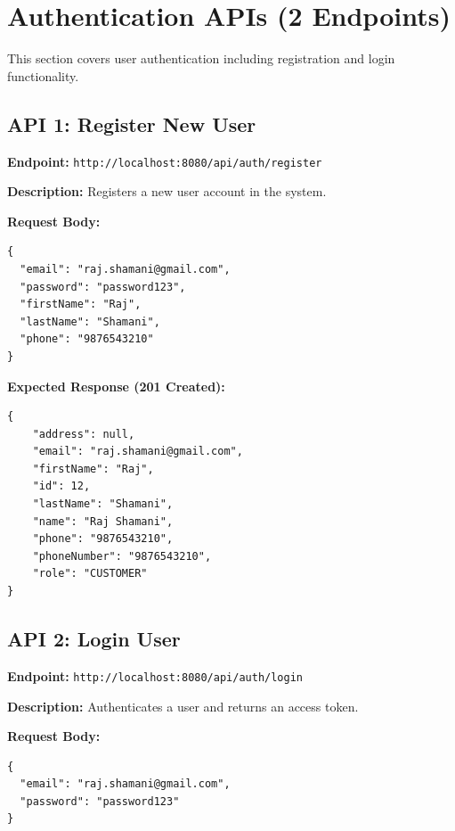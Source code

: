 \documentclass[12pt, a4paper]{article}
\begin{document}
\section{Authentication APIs (2 Endpoints)}

This section covers user authentication including registration and login functionality.

\subsection{API 1: Register New User}

\begin{tcolorbox}[colback=postcolor!10, colframe=postcolor, title=POST]
\textbf{Endpoint:} \texttt{http://localhost:8080/api/auth/register}
\end{tcolorbox}

\textbf{Description:} Registers a new user account in the system.

\textbf{Request Body:}
\begin{lstlisting}
{
  "email": "raj.shamani@gmail.com",
  "password": "password123",
  "firstName": "Raj",
  "lastName": "Shamani",
  "phone": "9876543210"
}
\end{lstlisting}

\textbf{Expected Response (201 Created):}
\begin{lstlisting}
{
    "address": null,
    "email": "raj.shamani@gmail.com",
    "firstName": "Raj",
    "id": 12,
    "lastName": "Shamani",
    "name": "Raj Shamani",
    "phone": "9876543210",
    "phoneNumber": "9876543210",
    "role": "CUSTOMER"
}
\end{lstlisting}

\vspace{0.5cm}

\subsection{API 2: Login User}

\begin{tcolorbox}[colback=postcolor!10, colframe=postcolor, title=POST]
\textbf{Endpoint:} \texttt{http://localhost:8080/api/auth/login}
\end{tcolorbox}

\textbf{Description:} Authenticates a user and returns an access token.

\textbf{Request Body:}
\begin{lstlisting}
{
  "email": "raj.shamani@gmail.com",
  "password": "password123"
}
\end{lstlisting}
\end{document}
